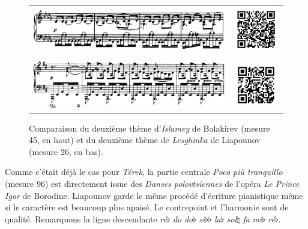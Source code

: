 \begin{figure}[!ht]
  \begin{bigcenter}
    \begin{tabular}{lr}
      \vspace*{0.0cm}
      \includegraphics[width=12.5cm, keepaspectratio]{islamey.png}
      &
      \includegraphics[width=3cm, keepaspectratio]{islamey-qr.png}
      \\
      \vspace{0.5cm} &
      \\
      \includegraphics[width=12.5cm, keepaspectratio]{lesghinka-theme2.png}
      &
      \includegraphics[width=3cm, keepaspectratio]{op11-qr.png}
    \end{tabular}
  \end{bigcenter}
  \caption{\label{lesghinka-2}Comparaison du deuxième thème d'\emph{Islamey} de Balakirev (mesure 45, en haut) et du deuxième thème de \emph{Lesghinka} de Liapounov (mesure 26, en bas).}
\end{figure}

Comme c'était déjà le cas pour \emph{Térek}, la partie centrale \emph{Poco pi\`{u} tranquillo} (mesure 96) est directement issue des \emph{Danses polovtsiennes} de l'opéra \emph{Le Prince Igor} de Borodine. Liapounov garde le même procédé d'écriture pianistique même si le caractère est beaucoup plus apaisé. Le contrepoint et l'harmonie sont de qualité. Remarquons la ligne descendante \emph{ré}$\flat$ \emph{do} \emph{do}$\flat$ \emph{si}$\flat\flat$ \emph{la}$\flat$ \emph{sol}$\natural$ \emph{fa} \emph{mi}$\flat$ \emph{ré}$\flat$. \\

